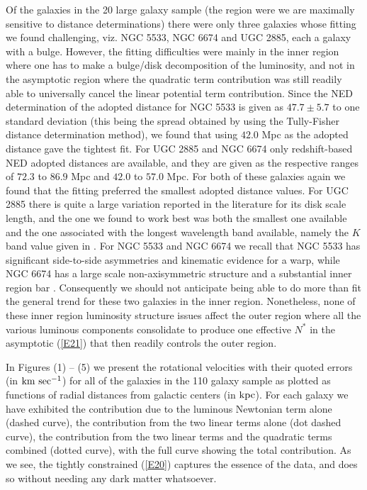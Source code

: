 \documentclass[preprint,aps]{revtex4}
\begin{document}
Of the galaxies in the 20 large galaxy sample (the region were we are maximally sensitive to distance determinations) there were only three galaxies whose fitting we found challenging, viz. NGC 5533, NGC 6674 and UGC 2885, each a galaxy with a bulge. However, the fitting difficulties were mainly in the inner region where one has to make a bulge/disk decomposition of the luminosity, and not in the asymptotic region where the quadratic term contribution was still readily able to universally cancel the linear potential term contribution. Since the NED determination of the adopted distance for NGC 5533 is given as $47.7 \pm 5.7$ to one standard deviation (this being the spread obtained by using the Tully-Fisher distance determination method), we found that using $42.0$ Mpc as the adopted distance gave the tightest fit. For UGC 2885 and NGC 6674 only redshift-based NED adopted distances are available, and they are given as the respective ranges of $72.3$ to $86.9$ Mpc and $42.0$ to $57.0$ Mpc. For both of these galaxies again we found that the fitting preferred the smallest adopted distance values. For UGC 2885 there is quite a large variation reported in the literature for its disk scale length, and the one we found to work best was both the smallest one available and the one associated with the longest wavelength band available, namely the $K$ band value given in \cite{Kim2007}.  For NGC 5533 and NGC 6674 we recall \cite{Sanders1996} that NGC 5533 has significant side-to-side asymmetries and kinematic evidence for a warp, while NGC 6674 has a large scale non-axisymmetric structure and a substantial inner region bar \cite{Broeils1992}. Consequently we should not anticipate being able to do more than fit the general trend for these  two galaxies in the inner region. Nonetheless, none of these inner region luminosity structure issues affect the outer region where all the various luminous components consolidate to produce one effective $N^*$ in the asymptotic (\ref{E21}) that then readily controls the outer region. 

In Figures (1) -- (5) we present  the rotational velocities with their quoted errors (in ${\rm km}~{\rm sec}^{-1}$) for all of the galaxies in the 110 galaxy sample as plotted as functions of radial distances from galactic centers (in ${\rm kpc}$). For each galaxy we have exhibited the contribution due to the luminous Newtonian term alone (dashed curve), the contribution from the two linear terms alone (dot dashed curve), the contribution from the two linear terms and the quadratic terms combined (dotted curve), with the full curve showing the total contribution. As we see, the tightly constrained (\ref{E20}) captures the essence of the data, and does so without needing any dark matter whatsoever. 
\end{document}
